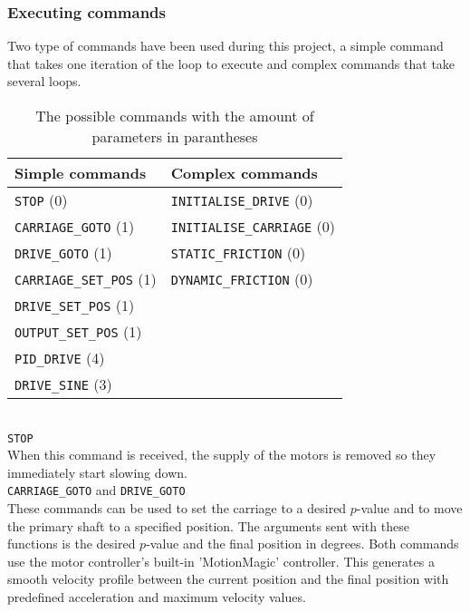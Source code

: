 \documentclass[12pt]{article}
\begin{document}
\subsubsection{Executing commands}
Two type of commands have been used during this project, a simple command that takes one iteration of the loop to execute and complex commands that take several loops. 
\begin{table}[]
    \centering
    \begin{tabular}{|l|l|}
         \hline
         \textbf{Simple commands}&\textbf{Complex commands}  \\
        \hline
         \verb|STOP| (0)&\verb|INITIALISE_DRIVE| (0)\\
         \verb|CARRIAGE_GOTO| (1)&\verb|INITIALISE_CARRIAGE| (0)\\
        \verb|DRIVE_GOTO| (1)&\verb|STATIC_FRICTION| (0)\\
        \verb|CARRIAGE_SET_POS| (1)&\verb|DYNAMIC_FRICTION| (0)\\
        \verb|DRIVE_SET_POS| (1)&\\
        \verb|OUTPUT_SET_POS| (1)&\\
        \verb|PID_DRIVE| (4)&\\
        \verb|DRIVE_SINE| (3)&\\
        \hline    
    
    \end{tabular}
    \caption{The possible commands with the amount of parameters in parantheses}
    \label{tab:my_label}
\end{table}\\

\verb|STOP|\\

When this command is received, the supply of the motors is removed so they immediately start slowing down.\\

\verb|CARRIAGE_GOTO| and \verb|DRIVE_GOTO| \\

These commands can be used to set the carriage to a desired $p$-value and to move the primary shaft to a specified position. The arguments sent with these functions is the desired $p$-value and the final position in degrees. Both commands use the motor controller's built-in 'MotionMagic' controller. This generates a smooth velocity profile between the current position and the final position with predefined acceleration and maximum velocity values. \\
\end{document}
